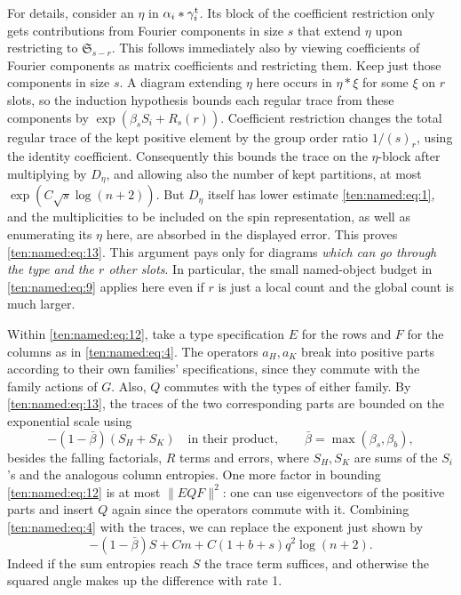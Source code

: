 For details, consider an \(\eta\) in \(\alpha_i*\gamma_i^{\rm t}\). Its block of the coefficient restriction only gets contributions from Fourier components in size \(s\) that extend \(\eta\) upon restricting to \(\mathfrak S_{s-r}\). This follows immediately also by viewing coefficients of Fourier components as matrix coefficients and restricting them. Keep just those components in size \(s\). A diagram extending \(\eta\) here occurs in \(\eta*\xi\) for some \(\xi\) on \(r\) slots, so the induction hypothesis bounds each regular trace from these components by \(\exp(\beta_s S_i+R_s(r))\). Coefficient restriction changes the total regular trace of the kept positive element by the group order ratio \(1/(s)_r\), using the identity coefficient. Consequently this bounds the trace on the \(\eta\)-block after multiplying by \(D_\eta\), and allowing also the number of kept partitions, at most \(\exp(C\sqrt{s}\log(n+2))\). But \(D_\eta\) itself has lower estimate \eqref{ten:named:eq:1}, and the multiplicities to be included on the spin representation, as well as enumerating its \(\eta\) here, are absorbed in the displayed error. This proves \eqref{ten:named:eq:13}. This argument pays only for diagrams \emph{which can go through the type and the \(r\) other slots}. In particular, the small named-object budget in \eqref{ten:named:eq:9} applies here even if \(r\) is just a local count and the global count is much larger.

Within \eqref{ten:named:eq:12}, take a type specification \(E\) for the rows and \(F\) for the columns as in \eqref{ten:named:eq:4}. The operators \(a_H,a_K\) break into positive parts according to their own families' specifications, since they commute with the family actions of \(G\). Also, \(Q\) commutes with the types of either family. By \eqref{ten:named:eq:13}, the traces of the two corresponding parts are bounded on the exponential scale using
\[
 -(1-\bar\beta)(S_H+S_K)
 \quad\text{in their product},\qquad
 \bar\beta=\max(\beta_s,\beta_b),
\]
besides the falling factorials, \(R\) terms and errors, where \(S_H,S_K\) are sums of the \(S_i\)'s and the analogous column entropies. One more factor in bounding \eqref{ten:named:eq:12} is at most
\(\|E Q F\|^2\): one can use eigenvectors of the positive parts and insert \(Q\) again since the operators commute with it. Combining \eqref{ten:named:eq:4} with the traces, we can replace the exponent just shown by
\begin{equation}
 -(1-\bar\beta) S + C m + C(1+b+s)q^2\log(n+2).
 \label{ten:named:eq:14}
\end{equation}
Indeed if the sum entropies reach \(S\) the trace term suffices, and otherwise the squared angle makes up the difference with rate 1.

